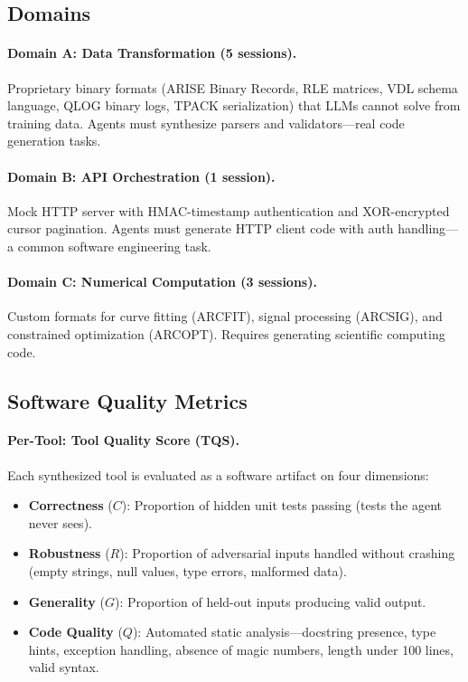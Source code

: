 \documentclass[]{ceurart}
\begin{document}
\subsection{Domains}

\paragraph{Domain A: Data Transformation (5 sessions).} Proprietary binary formats (ARISE Binary Records, RLE matrices, VDL schema language, QLOG binary logs, TPACK serialization) that LLMs cannot solve from training data. Agents must synthesize parsers and validators---real code generation tasks.

\paragraph{Domain B: API Orchestration (1 session).} Mock HTTP server with HMAC-timestamp authentication and XOR-encrypted cursor pagination. Agents must generate HTTP client code with auth handling---a common software engineering task.

\paragraph{Domain C: Numerical Computation (3 sessions).} Custom formats for curve fitting (ARCFIT), signal processing (ARCSIG), and constrained optimization (ARCOPT). Requires generating scientific computing code.

\subsection{Software Quality Metrics}

\paragraph{Per-Tool: Tool Quality Score (TQS).} Each synthesized tool is evaluated as a software artifact on four dimensions:

\begin{itemize}
\item \textbf{Correctness} ($C$): Proportion of hidden unit tests passing (tests the agent never sees).
\item \textbf{Robustness} ($R$): Proportion of adversarial inputs handled without crashing (empty strings, null values, type errors, malformed data).
\item \textbf{Generality} ($G$): Proportion of held-out inputs producing valid output.
\item \textbf{Code Quality} ($Q$): Automated static analysis---docstring presence, type hints, exception handling, absence of magic numbers, length under 100 lines, valid syntax.
\end{itemize}
\end{document}
